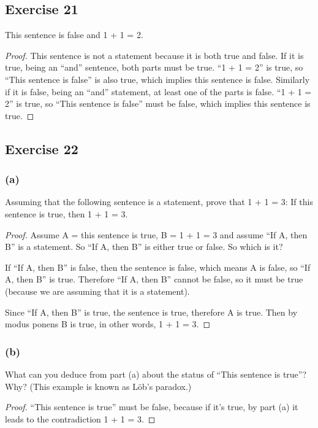 \documentclass[14pt]{extarticle}
\begin{document}
\subsection{Exercise 21}
This sentence is false and 1 + 1 = 2.

\begin{proof}
This sentence is not a statement because it is both true and false. If it is true, being an ``and'' sentence, both
parts must be true. ``1 + 1 = 2'' is true, so ``This sentence is false'' is also true, which implies this 
sentence is false. Similarly if it is false, being an ``and'' statement, at least one of the parts is false. 
``1 + 1 = 2'' is true, so ``This sentence is false'' must be false, which implies this sentence is true.
\end{proof}

\subsection{Exercise 22}

\subsubsection{(a)}
Assuming that the following sentence is a statement, prove that 1 + 1 = 3: If this sentence is true, then 1 + 1 = 3.

\begin{proof}
Assume A = this sentence is true, B = 1 + 1 = 3 and assume ``If A, then B'' is a statement. So ``If A, then B'' is 
either true or false. So which is it? 

If ``If A, then B'' is false, then the sentence is false, which means A is false, so ``If A, then B'' is true.
Therefore ``If A, then B'' cannot be false, so it must be true (because we are assuming that it is a statement).

Since ``If A, then B'' is true, the sentence is true, therefore A is true. Then by modus ponens B is true, in 
other words, 1 + 1 = 3.
\end{proof}

\subsubsection{(b)}
What can you deduce from part (a) about the status of “This sentence is true”? Why? 
(This example is known as Löb’s paradox.)

\begin{proof}
``This sentence is true'' must be false, because if it's true, by part (a) it leads to the contradiction 1 + 1 = 3.
\end{proof}
\end{document}

